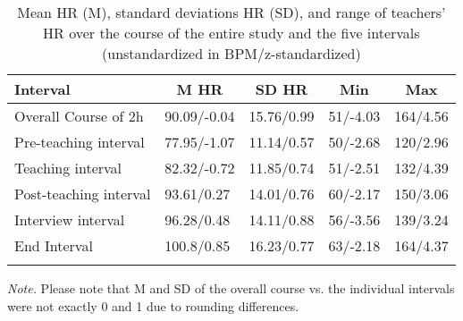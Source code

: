 


\begin{table}[h]

\begin{center}
\begin{threeparttable}

\caption{\label{tab:table_1}Mean HR (M), standard deviations HR (SD), and range of teachers’ HR over the course of the entire study and the five intervals (unstandardized in BPM/z-standardized)}

\begin{tabular}{lllll}
\toprule
Interval & \multicolumn{1}{c}{M HR} & \multicolumn{1}{c}{SD HR} & \multicolumn{1}{c}{Min} & \multicolumn{1}{c}{Max}\\
\midrule
Overall Course of 2h & 90.09/-0.04 & 15.76/0.99 & 51/-4.03 & 164/4.56\\
Pre-teaching interval & 77.95/-1.07 & 11.14/0.57 & 50/-2.68 & 120/2.96\\
Teaching interval & 82.32/-0.72 & 11.85/0.74 & 51/-2.51 & 132/4.39\\
Post-teaching interval & 93.61/0.27 & 14.01/0.76 & 60/-2.17 & 150/3.06\\
Interview interval & 96.28/0.48 & 14.11/0.88 & 56/-3.56 & 139/3.24\\
End Interval & 100.8/0.85 & 16.23/0.77 & 63/-2.18 & 164/4.37\\
\bottomrule
\addlinespace
\end{tabular}

\begin{tablenotes}[para]
\normalsize{\textit{Note.} Please note that M and SD of the overall course vs. the individual intervals were not exactly 0 and 1 due to rounding differences.}
\end{tablenotes}

\end{threeparttable}
\end{center}

\end{table}



